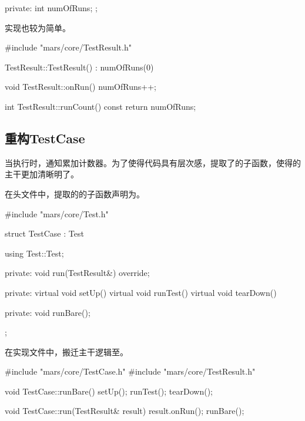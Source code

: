 \begin{content}
\begin{leftbar}
\begin{c++}[caption={\ttfamily{include/mars/core/TestResult.h}}]
{private:
  int numOfRuns;
};
 \end{c++}
\end{leftbar}

实现也较为简单。

\begin{leftbar}
 \begin{c++}[caption={\ttfamily{src/mars/core/TestResult.cc}}]
#include "mars/core/TestResult.h"

TestResult::TestResult() : numOfRuns(0) {
}

void TestResult::onRun() {
  numOfRuns++;
}

int TestResult::runCount() const {
  return numOfRuns;
}
 \end{c++}
\end{leftbar}

\subsection{重构TestCase}

当执行时，通知累加计数器。为了使得代码具有层次感，提取了的子函数，使得的主干更加清晰明了。

在头文件中，提取的的子函数声明为。

\begin{leftbar}
 \begin{c++}[caption={\ttfamily{include/mars/core/TestCase.h}}]
#include "mars/core/Test.h"

struct TestCase : Test {
  using Test::Test;

private:
  void run(TestResult&) override;

private:
  virtual void setUp() {}
  virtual void runTest() {}
  virtual void tearDown() {}

private:
  void runBare();
};
 \end{c++}
\end{leftbar}

在实现文件中，搬迁主干逻辑至。

\begin{leftbar}
 \begin{c++}[caption={\ttfamily{src/mars/core/TestCase.cc}}]
#include "mars/core/TestCase.h"
#include "mars/core/TestResult.h"

void TestCase::runBare() {
  setUp();
  runTest();
  tearDown();
}

void TestCase::run(TestResult& result) {
  result.onRun();
  runBare();
}
 \end{c++}
\end{leftbar}


\end{content}

